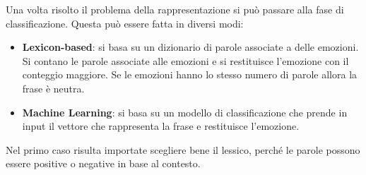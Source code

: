 Una volta risolto il problema della rappresentazione si può passare alla fase
di classificazione. Questa può essere fatta in diversi modi:
\begin{itemize}
      \item \textbf{Lexicon-based}: si basa su un dizionario di parole associate
            a delle emozioni. Si contano le parole associate alle emozioni e si
            restituisce l'emozione con il conteggio maggiore. Se le emozioni hanno
            lo stesso numero di parole allora la frase è neutra.
      \item \textbf{Machine Learning}: si basa su un modello di classificazione
            che prende in input il vettore che rappresenta la frase e restituisce
            l'emozione.
\end{itemize}
\begin{nota}
      Nel primo caso risulta importate scegliere bene il lessico, perché le parole
      possono essere positive o negative in base al contesto.
\end{nota}